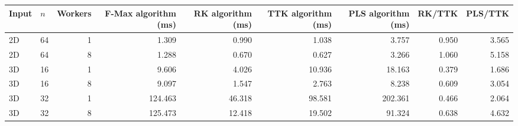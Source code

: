 \begin{tabular}{llrrrrrrr}
\hline
Input & $n$ & Workers & F-Max algorithm (ms) & RK algorithm (ms) & TTK algorithm (ms) & PLS algorithm (ms) & RK/TTK & PLS/TTK \\
\hline
2D & 64 & 1 & 1.309 & 0.990 & 1.038 & 3.757 & 0.950 & 3.565 \\
2D & 64 & 8 & 1.288 & 0.670 & 0.627 & 3.266 & 1.060 & 5.158 \\
3D & 16 & 1 & 9.606 & 4.026 & 10.936 & 18.163 & 0.379 & 1.686 \\
3D & 16 & 8 & 9.097 & 1.547 & 2.763 & 8.238 & 0.609 & 3.054 \\
3D & 32 & 1 & 124.463 & 46.318 & 98.581 & 202.361 & 0.466 & 2.064 \\
3D & 32 & 8 & 125.473 & 12.418 & 19.502 & 91.324 & 0.638 & 4.632 \\
\hline
\end{tabular}
